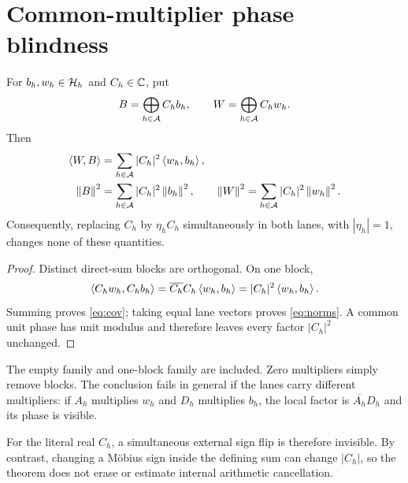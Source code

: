 \section{Common-multiplier phase blindness}

\begin{theorem}
For $b_h,w_h\in\mathcal H_h$ and $C_h\in\mathbb C$, put
\[
B=\bigoplus_{h\in\mathcal A}C_hb_h,
\qquad
W=\bigoplus_{h\in\mathcal A}C_hw_h.
\]
Then
\begin{align}
\left\langle W,B\right\rangle&=\sum_{h\in\mathcal A}|C_h|^2\left\langle w_h,b_h\right\rangle,\label{eq:cov}\\
\left\lVert B\right\rVert^2&=\sum_{h\in\mathcal A}|C_h|^2\left\lVert b_h\right\rVert^2,\qquad
\left\lVert W\right\rVert^2=\sum_{h\in\mathcal A}|C_h|^2\left\lVert w_h\right\rVert^2.\label{eq:norms}
\end{align}
Consequently, replacing $C_h$ by $\eta_hC_h$ simultaneously in both lanes,
with $|\eta_h|=1$, changes none of these quantities.
\end{theorem}

\begin{proof}
Distinct direct-sum blocks are orthogonal.  On one block,
\[
\left\langle C_hw_h,C_hb_h\right\rangle
=\overline{C_h}C_h\left\langle w_h,b_h\right\rangle
=|C_h|^2\left\langle w_h,b_h\right\rangle.
\]
Summing proves \eqref{eq:cov}; taking equal lane vectors proves
\eqref{eq:norms}.  A common unit phase has unit modulus and therefore leaves
every factor $|C_h|^2$ unchanged.
\end{proof}

The empty family and one-block family are included.  Zero multipliers simply
remove blocks.  The conclusion fails in general if the lanes carry different
multipliers: if $A_h$ multiplies $w_h$ and $D_h$ multiplies $b_h$, the local
factor is $\overline{A_h}D_h$ and its phase is visible.

For the literal real $C_h$, a simultaneous external sign flip is therefore
invisible.  By contrast, changing a Möbius sign inside the defining sum can
change $|C_h|$, so the theorem does not erase or estimate internal arithmetic
cancellation.

